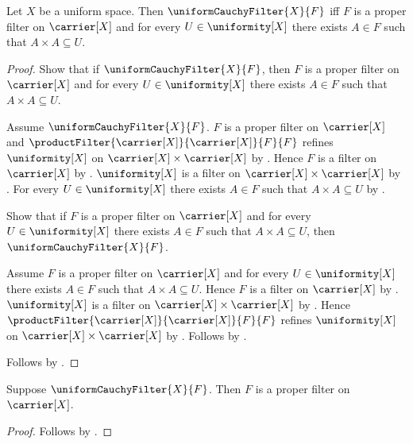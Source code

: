 \begin{theorem}\label{uniform_cauchy_filter_iff_entourage_squares}
    Let $X$ be a uniform space.
    Then $\uniformCauchyFilter{X}{F}$ iff
        $F$ is a proper filter on $\carrier[X]$ and
        for every $U\in\uniformity[X]$ there exists $A\in F$ such that
            $A\times A\subseteq U$.
\end{theorem}
\begin{proof}
    Show that if $\uniformCauchyFilter{X}{F}$, then
        $F$ is a proper filter on $\carrier[X]$ and
        for every $U\in\uniformity[X]$ there exists $A\in F$ such that
            $A\times A\subseteq U$.
    \begin{subproof}
        Assume $\uniformCauchyFilter{X}{F}$.
        $F$ is a proper filter on $\carrier[X]$ and
            $\productFilter{\carrier[X]}{\carrier[X]}{F}{F}$ refines
                $\uniformity[X]$ on
                $\carrier[X]\times\carrier[X]$ by
            .
        Hence $F$ is a filter on $\carrier[X]$ by
            .
        $\uniformity[X]$ is a filter on
            $\carrier[X]\times\carrier[X]$ by .
        For every $U\in\uniformity[X]$ there exists $A\in F$ such that
            $A\times A\subseteq U$ by
            .
    \end{subproof}

    Show that if $F$ is a proper filter on $\carrier[X]$ and
        for every $U\in\uniformity[X]$ there exists $A\in F$ such that
            $A\times A\subseteq U$, then $\uniformCauchyFilter{X}{F}$.
    \begin{subproof}
        Assume $F$ is a proper filter on $\carrier[X]$ and
            for every $U\in\uniformity[X]$ there exists $A\in F$ such
            that $A\times A\subseteq U$.
        Hence $F$ is a filter on $\carrier[X]$ by
            .
        $\uniformity[X]$ is a filter on
            $\carrier[X]\times\carrier[X]$ by .
        Hence $\productFilter{\carrier[X]}{\carrier[X]}{F}{F}$ refines
            $\uniformity[X]$ on
            $\carrier[X]\times\carrier[X]$ by
            .
        Follows by .
    \end{subproof}
    Follows by \auto.
\end{proof}

\begin{proposition}\label{uniform_cauchy_filter_is_proper}
    Suppose $\uniformCauchyFilter{X}{F}$.
    Then $F$ is a proper filter on $\carrier[X]$.
\end{proposition}
\begin{proof}
    Follows by .
\end{proof}

